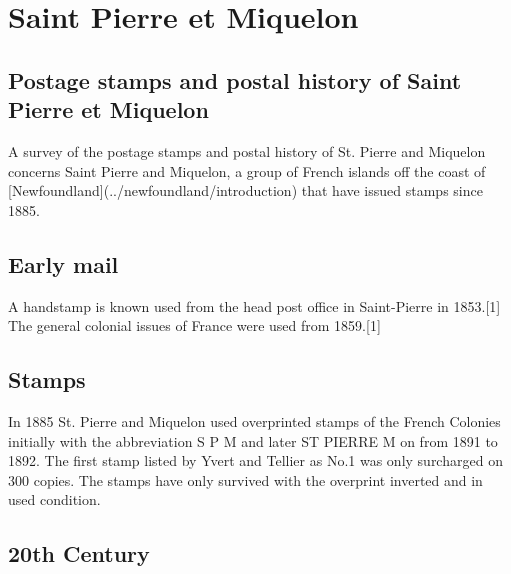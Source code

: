 
\section{Saint Pierre et Miquelon}
\subsection{Postage stamps and postal history of Saint Pierre et Miquelon}


A survey of the postage stamps and postal history of St. Pierre and Miquelon concerns Saint Pierre and Miquelon, a group of French islands off the coast of [Newfoundland](../newfoundland/introduction) that have issued stamps since 1885.


\subsection{Early mail}

A handstamp is known used from the head post office in Saint-Pierre in 1853.[1] The general colonial issues of France were used from 1859.[1] 

\subsection{Stamps}
In 1885 St. Pierre and Miquelon used overprinted stamps of the French Colonies initially with the abbreviation \textsc{S P M} and later \textsc{ST PIERRE M} on from 1891 to 1892. The first stamp listed by Yvert and Tellier as No.1 was only surcharged on 300 copies. The stamps have only survived with the overprint inverted and in used condition.



\subsection{20th Century}

